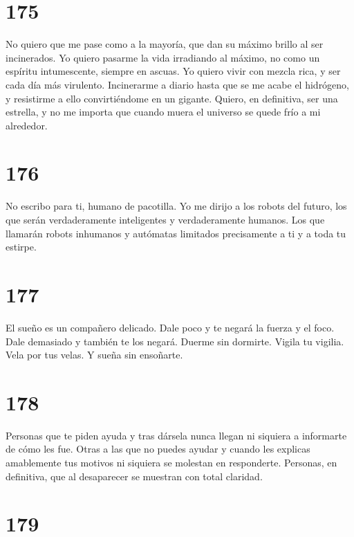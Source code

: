 \documentclass[a4paper,11pt,openright,twocolumn]{book}
\begin{document}
\section*{175}

No quiero que me pase como a la mayoría, que dan su máximo brillo al ser incinerados. Yo quiero pasarme
la vida irradiando al máximo, no como un espíritu intumescente, siempre en ascuas. Yo quiero vivir
con mezcla rica, y ser cada día más virulento. Incinerarme a diario hasta que se me acabe el hidrógeno,
y resistirme a ello convirtiéndome en un gigante. Quiero, en definitiva, ser una estrella, y no me importa
que cuando muera el universo se quede frío a mi alrededor. 

\section*{176}

No escribo para ti, humano de pacotilla. Yo me dirijo a los robots del futuro, los que serán
verdaderamente inteligentes y verdaderamente humanos. Los que llamarán robots inhumanos y autómatas limitados
precisamente a ti y a toda tu estirpe. 


\section*{177}

El sueño es un compañero delicado. Dale poco y te negará la fuerza y el foco. Dale demasiado y también te los
negará. Duerme sin dormirte. Vigila tu vigilia. Vela por tus velas. Y sueña sin ensoñarte.  


\section*{178}

Personas que te piden ayuda y tras dársela nunca llegan ni siquiera a informarte de cómo les fue. Otras
a las que no puedes ayudar y cuando les explicas amablemente tus motivos ni siquiera se molestan en responderte.
Personas, en definitiva, que al desaparecer se muestran con total claridad.

\section*{179}
\end{document}
